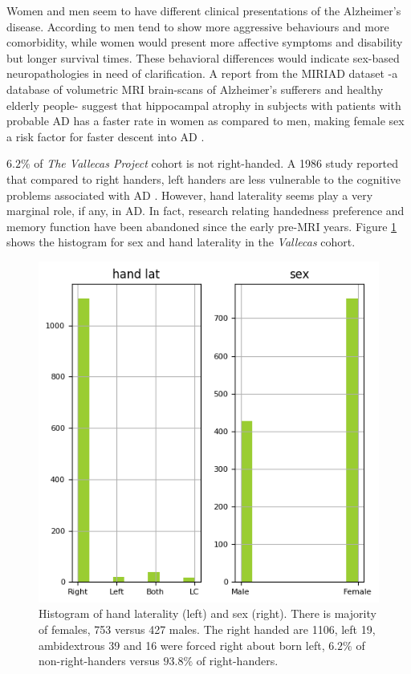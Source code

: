 \documentclass[11pt]{article}
\theoremstyle{definition}
\theoremstyle{remark}
\begin{document}
Women and men seem to have different clinical presentations of the Alzheimer's disease. According to \cite{sinforiani2010impact} men tend to show more aggressive behaviours and more comorbidity, while women would present more affective symptoms and disability but longer survival times. These behavioral differences would indicate sex-based neuropathologies in need of clarification. A report from the MIRIAD dataset \cite{malone2013miriad} -a database of volumetric MRI brain-scans of Alzheimer's sufferers and healthy elderly people- suggest that hippocampal atrophy in subjects with patients with probable AD has a faster rate in women as compared to men, making female sex a risk factor for faster descent into AD \cite{ardekani2016analysis}.

$6.2\%$ of \emph{The Vallecas Project} cohort is not right-handed. A 1986 study reported that compared to right handers, left handers are less vulnerable to the cognitive problems associated with AD \cite{de1986reduced}. However, hand laterality seems play a very marginal role, if any, in AD. In fact, research relating handedness preference and memory function have been abandoned since the early pre-MRI years. Figure \ref{fig:sexlat} shows the histogram for sex and hand laterality in the \emph{Vallecas} cohort.
\begin{figure}[H]
        \centering
        \includegraphics[keepaspectratio, width=.6\linewidth]{figures/Fig_sexlat}
        \caption{Histogram of hand laterality (left) and sex (right). There is majority of females, 753 versus 427 males. The right handed are 1106, left 19, ambidextrous 39 and 16 were forced right about born left,  $6.2\%$ of non-right-handers versus $93.8\%$ of right-handers.} 
        \label{fig:sexlat}
\end{figure}
\end{document}
